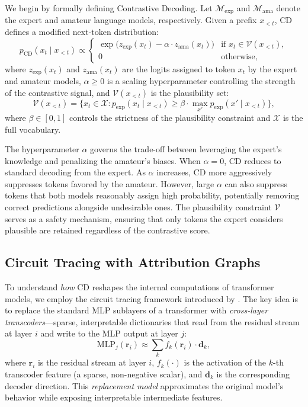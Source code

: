 \documentclass[11pt]{article}
\begin{document}
We begin by formally defining Contrastive Decoding. Let $\mathcal{M}_{\text{exp}}$ and $\mathcal{M}_{\text{ama}}$ denote the expert and amateur language models, respectively. Given a prefix $x_{<t}$, CD defines a modified next-token distribution:
\begin{equation}
\label{eq:cd}
p_{\text{CD}}(x_t \mid x_{<t}) \propto
\begin{cases}
\exp\!\bigl(z_{\text{exp}}(x_t) - \alpha \cdot z_{\text{ama}}(x_t)\bigr) & \text{if } x_t \in \mathcal{V}(x_{<t}), \\
0 & \text{otherwise},
\end{cases}
\end{equation}
where $z_{\text{exp}}(x_t)$ and $z_{\text{ama}}(x_t)$ are the logits assigned to token $x_t$ by the expert and amateur models, $\alpha \geq 0$ is a scaling hyperparameter controlling the strength of the contrastive signal, and $\mathcal{V}(x_{<t})$ is the plausibility set:
\begin{equation}
\label{eq:plausibility}
\mathcal{V}(x_{<t}) = \bigl\{ x_t \in \mathcal{X} : p_{\text{exp}}(x_t \mid x_{<t}) \geq \beta \cdot \max_{x'} p_{\text{exp}}(x' \mid x_{<t}) \bigr\},
\end{equation}
where $\beta \in [0, 1]$ controls the strictness of the plausibility constraint and $\mathcal{X}$ is the full vocabulary.

The hyperparameter $\alpha$ governs the trade-off between leveraging the expert's knowledge and penalizing the amateur's biases. When $\alpha = 0$, CD reduces to standard decoding from the expert. As $\alpha$ increases, CD more aggressively suppresses tokens favored by the amateur. However, large $\alpha$ can also suppress tokens that both models reasonably assign high probability, potentially removing correct predictions alongside undesirable ones. The plausibility constraint $\mathcal{V}$ serves as a safety mechanism, ensuring that only tokens the expert considers plausible are retained regardless of the contrastive score.

\subsection{Circuit Tracing with Attribution Graphs}
\label{sec:attribution-graphs}

To understand \emph{how} CD reshapes the internal computations of transformer models, we employ the circuit tracing framework introduced by \citet{anthropic2025attribution}. The key idea is to replace the standard MLP sublayers of a transformer with \emph{cross-layer transcoders}---sparse, interpretable dictionaries that read from the residual stream at layer $i$ and write to the MLP output at layer $j$:
\begin{equation}
\label{eq:transcoder}
\text{MLP}_j(\mathbf{r}_i) \approx \sum_{k} f_k(\mathbf{r}_i) \cdot \mathbf{d}_k,
\end{equation}
where $\mathbf{r}_i$ is the residual stream at layer $i$, $f_k(\cdot)$ is the activation of the $k$-th transcoder feature (a sparse, non-negative scalar), and $\mathbf{d}_k$ is the corresponding decoder direction. This \emph{replacement model} approximates the original model's behavior while exposing interpretable intermediate features.
\end{document}
